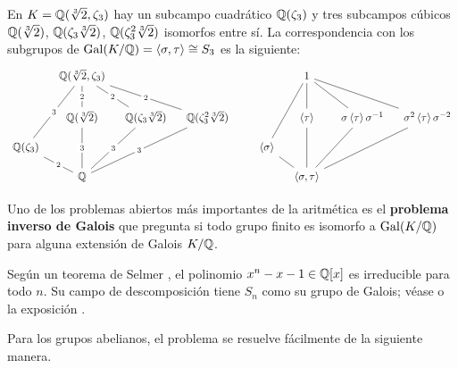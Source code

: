 \begin{ejemplo}
  En $K = \mathbb{Q} (\sqrt[3]{2}, \zeta_3)$ hay un subcampo cuadrático $\mathbb{Q} (\zeta_3)$
  y tres subcampos cúbicos $\mathbb{Q}(\sqrt[3]{2})$, $\mathbb{Q}(\zeta_3\sqrt[3]{2})$,
  $\mathbb{Q}(\zeta_3^2\sqrt[3]{2})$ isomorfos entre sí. La correspondencia con los
  subgrupos de $\operatorname{Gal} (K/\mathbb{Q}) = \langle\sigma,\tau\rangle \cong S_3$ es la
  siguiente:
  \[ \begin{tikzcd}[row sep=1em,column sep=1em]
    & \QQ (\sqrt[3]{2}, \zeta_3)\ar[-]{dd}[description]{2}\ar[-]{ddr}[description]{2}\ar[-]{ddrr}[description]{2}\ar[-]{dddl}[description]{3} & & & & & 1\ar[-]{dd}\ar[-]{ddr}\ar[-]{ddrr}\ar[-]{dddl} \\
    \\
    & \QQ (\sqrt[3]{2})\ar[-]{dd}[description]{3} & \QQ (\zeta_3\sqrt[3]{2})\ar[-]{ddl}[description]{3} & \QQ (\zeta_3^2\sqrt[3]{2})\ar[-]{ddll}[description]{3} & & & \langle\tau\rangle\ar[-]{dd} & \,\sigma\,\langle\tau\rangle\,\sigma^{-1}\ar[-]{ddl} & \sigma^2\,\langle\tau\rangle\,\sigma^{-2}\ar[-]{ddll} \\
    \QQ (\zeta_3)\ar[-]{dr}[description]{2} & & & & & \langle\sigma\rangle\ar[-]{dr} \\
    & \QQ & & & & & \langle\sigma,\tau\rangle
  \end{tikzcd} \]
\end{ejemplo}

Uno de los problemas abiertos más importantes de la aritmética es el
\textbf{problema inverso de Galois} que pregunta si todo grupo finito es
isomorfo a $\operatorname{Gal} (K/\mathbb{Q})$ para alguna extensión de Galois $K/\mathbb{Q}$.

\begin{ejemplo}
  Según un teorema de Selmer \cite{Selmer-1956}, el polinomio
  $x^n - x - 1 \in \mathbb{Q} [x]$ es irreducible para todo $n$. Su campo de
  descomposición tiene $S_n$ como su grupo de Galois; véase \cite{Osada-1987}
  o la exposición \cite{KCd-Selmer}.
\end{ejemplo}

Para los grupos abelianos, el problema se resuelve fácilmente de la siguiente
manera.

